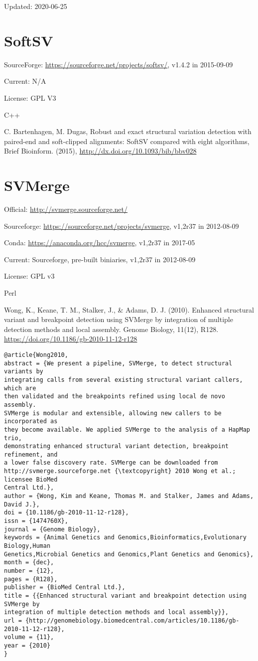 \documentclass[]{article}
\begin{document}
Updated: 2020-06-25

\section{SoftSV}

SourceForge: \url{https://sourceforge.net/projects/softsv/}, v1.4.2 in 2015-09-09

Current: N/A

License: GPL V3

C++

C. Bartenhagen, M. Dugas, Robust and exact structural variation detection with paired-end and soft-clipped alignments: SoftSV compared with eight algorithms, Brief Bioinform. (2015), \url{http://dx.doi.org/10.1093/bib/bbv028}

\section{SVMerge}

Official: \url{http://svmerge.sourceforge.net/}

Sourceforge: \url{https://sourceforge.net/projects/svmerge}, v1,2r37 in 2012-08-09

Conda: \url{https://anaconda.org/hcc/svmerge}, v1,2r37 in 2017-05

Current: Sourceforge, pre-built biniaries, v1,2r37 in 2012-08-09

License: GPL v3

Perl

Wong, K., Keane, T. M., Stalker, J., \& Adams, D. J. (2010). Enhanced structural variant and breakpoint detection using SVMerge by integration of multiple detection methods and local assembly. Genome Biology, 11(12), R128. \url{https://doi.org/10.1186/gb-2010-11-12-r128}

\begin{verbatim}
@article{Wong2010,
abstract = {We present a pipeline, SVMerge, to detect structural variants by
integrating calls from several existing structural variant callers, which are
then validated and the breakpoints refined using local de novo assembly.
SVMerge is modular and extensible, allowing new callers to be incorporated as
they become available. We applied SVMerge to the analysis of a HapMap trio,
demonstrating enhanced structural variant detection, breakpoint refinement, and
a lower false discovery rate. SVMerge can be downloaded from
http://svmerge.sourceforge.net {\textcopyright} 2010 Wong et al.; licensee BioMed
Central Ltd.},
author = {Wong, Kim and Keane, Thomas M. and Stalker, James and Adams, David J.},
doi = {10.1186/gb-2010-11-12-r128},
issn = {1474760X},
journal = {Genome Biology},
keywords = {Animal Genetics and Genomics,Bioinformatics,Evolutionary Biology,Human
Genetics,Microbial Genetics and Genomics,Plant Genetics and Genomics},
month = {dec},
number = {12},
pages = {R128},
publisher = {BioMed Central Ltd.},
title = {{Enhanced structural variant and breakpoint detection using SVMerge by
integration of multiple detection methods and local assembly}},
url = {http://genomebiology.biomedcentral.com/articles/10.1186/gb-2010-11-12-r128},
volume = {11},
year = {2010}
}
\end{verbatim}
\end{document}

